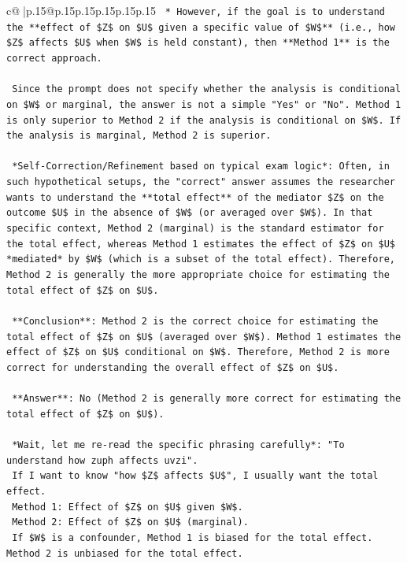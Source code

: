 \documentclass{article}
\begin{document}
{\begin{supertabular}{c@{$\;$}|p{.15\linewidth}@{}p{.15\linewidth}p{.15\linewidth}p{.15\linewidth}p{.15\linewidth}p{.15\linewidth}}
{{{\texttt{    *   However, if the goal is to understand the **effect of \$Z\$ on \$U\$ given a specific value of \$W\$** (i.e., how \$Z\$ affects \$U\$ when \$W\$ is held constant), then **Method 1** is the correct approach.} \\
\\ 
\texttt{    Since the prompt does not specify whether the analysis is conditional on \$W\$ or marginal, the answer is not a simple "Yes" or "No". Method 1 is only superior to Method 2 if the analysis is conditional on \$W\$. If the analysis is marginal, Method 2 is superior.} \\
\\ 
\texttt{    *Self{-}Correction/Refinement based on typical exam logic*: Often, in such hypothetical setups, the "correct" answer assumes the researcher wants to understand the **total effect** of the mediator \$Z\$ on the outcome \$U\$ in the absence of \$W\$ (or averaged over \$W\$). In that specific context, Method 2 (marginal) is the standard estimator for the total effect, whereas Method 1 estimates the effect of \$Z\$ on \$U\$ *mediated* by \$W\$ (which is a subset of the total effect). Therefore, Method 2 is generally the more appropriate choice for estimating the total effect of \$Z\$ on \$U\$.} \\
\\ 
\texttt{    **Conclusion**: Method 2 is the correct choice for estimating the total effect of \$Z\$ on \$U\$ (averaged over \$W\$). Method 1 estimates the effect of \$Z\$ on \$U\$ conditional on \$W\$. Therefore, Method 2 is more correct for understanding the overall effect of \$Z\$ on \$U\$.} \\
\\ 
\texttt{    **Answer**: No (Method 2 is generally more correct for estimating the total effect of \$Z\$ on \$U\$).} \\
\\ 
\texttt{    *Wait, let me re{-}read the specific phrasing carefully*: "To understand how zuph affects uvzi".} \\
\texttt{    If I want to know "how \$Z\$ affects \$U\$", I usually want the total effect.} \\
\texttt{    Method 1: Effect of \$Z\$ on \$U\$ given \$W\$.} \\
\texttt{    Method 2: Effect of \$Z\$ on \$U\$ (marginal).} \\
\texttt{    If \$W\$ is a confounder, Method 1 is biased for the total effect. Method 2 is unbiased for the total effect.} \\
}}}
\end{supertabular}}
\end{document}
